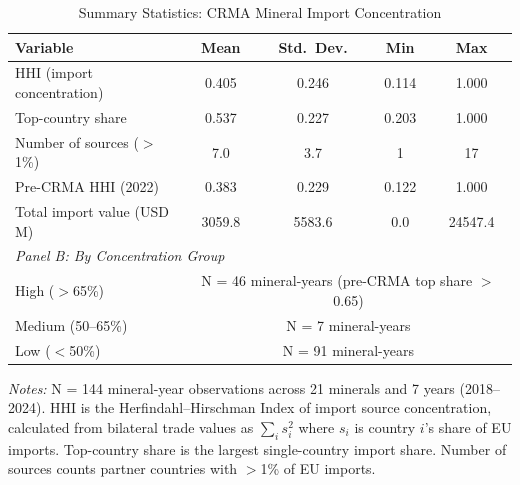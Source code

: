 \begin{table}[H]
\centering
\caption{Summary Statistics: CRMA Mineral Import Concentration}
\label{tab:summary}
\begin{threeparttable}
\begin{tabular}{lcccc}
\toprule
Variable & Mean & Std.~Dev. & Min & Max \\
\midrule
HHI (import concentration) & 0.405 & 0.246 & 0.114 & 1.000 \\
Top-country share & 0.537 & 0.227 & 0.203 & 1.000 \\
Number of sources ($>$1\%) & 7.0 & 3.7 & 1 & 17 \\
Pre-CRMA HHI (2022) & 0.383 & 0.229 & 0.122 & 1.000 \\
Total import value (USD M) & 3059.8 & 5583.6 & 0.0 & 24547.4 \\
\midrule
\multicolumn{5}{l}{\textit{Panel B: By Concentration Group}} \\
\midrule
High ($>$65\%) & \multicolumn{4}{c}{N = 46 mineral-years (pre-CRMA top share $>$ 0.65)} \\
Medium (50--65\%) & \multicolumn{4}{c}{N = 7 mineral-years} \\
Low ($<$50\%) & \multicolumn{4}{c}{N = 91 mineral-years} \\
\bottomrule
\end{tabular}
\begin{tablenotes}[flushleft]
\small
\item \textit{Notes:} N = 144 mineral-year observations across 21 minerals and 7 years (2018--2024). HHI is the Herfindahl--Hirschman Index of import source concentration, calculated from bilateral trade values as $\sum_i s_i^2$ where $s_i$ is country $i$'s share of EU imports. Top-country share is the largest single-country import share. Number of sources counts partner countries with $>$1\% of EU imports.
\end{tablenotes}
\end{threeparttable}
\end{table}
